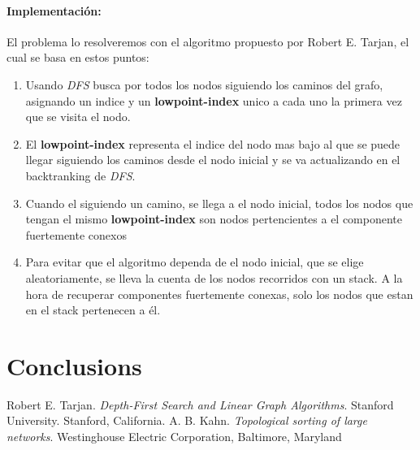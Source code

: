 \documentclass{article}
\begin{document}
\paragraph{Implementación:} El problema lo resolveremos con el algoritmo propuesto por Robert E. Tarjan\cite{tarjan}, el cual se basa en estos puntos:
\begin{enumerate}
	\item Usando \textit{DFS} busca por todos los nodos siguiendo los caminos del grafo, asignando un indice y un \textbf{lowpoint-index} unico a cada uno la primera vez que se visita el nodo.
	\item El \textbf{lowpoint-index} representa el indice del nodo mas bajo al que se puede llegar siguiendo los caminos desde el nodo inicial y se va actualizando en el backtranking de
\textit{DFS}.
	\item Cuando el siguiendo un camino, se llega a el nodo inicial, todos los nodos que tengan el mismo \textbf{lowpoint-index} son nodos pertencientes a el componente fuertemente conexos
	\item Para evitar que el algoritmo dependa de el nodo inicial, que se elige aleatoriamente, se lleva la cuenta de los nodos recorridos con un stack. A la hora de recuperar componentes fuertemente conexas,
solo los nodos que estan en el stack pertenecen a él.
\end{enumerate}
\section{Conclusions}\label{conclusions}

\begin{thebibliography}{9}
 Robert E. Tarjan. \textit{Depth-First Search and Linear Graph Algorithms}.
Stanford University. Stanford, California.
 A. B. Kahn. \textit{Topological sorting of large networks}. Westinghouse Electric Corporation, Baltimore, Maryland
\end{thebibliography}
\end{document}

